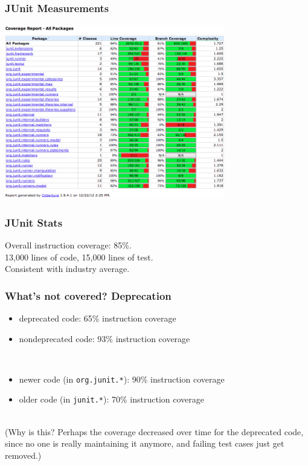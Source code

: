 \documentclass{beamer}
\newenvironment{changemargin}[1]{%
  \begin{list}{}{%
    \setlength{\topsep}{0pt}%
    \setlength{\leftmargin}{#1}%
    \setlength{\rightmargin}{1em}
    \setlength{\listparindent}{\parindent}%
    \setlength{\itemindent}{\parindent}%
    \setlength{\parsep}{\parskip}%
  }%
  \item[]}{\end{list}}
\begin{document}
\begin{frame}
  \frametitle{JUnit Measurements}
\begin{center}
  \includegraphics[height=3in]{L03/cobertura-junit.png}
\end{center}
\end{frame}

\begin{frame}
  \frametitle{JUnit Stats}
  \begin{changemargin}{2em}
    Overall instruction coverage: 85\%.\\[1em]
    13,000 lines of code, 15,000 lines of test.\\[1em]
    Consistent with industry average.
  \end{changemargin}
\end{frame}

\begin{frame}
  \frametitle{What's not covered? Deprecation}
  \begin{changemargin}{2em}
    \begin{itemize}
    \item deprecated code: 65\% instruction coverage
    \item nondeprecated code: 93\% instruction coverage
    \end{itemize}
    ~\\[1em]
    \begin{itemize}
    \item newer code (in {\tt org.junit.*}): 90\% instruction coverage
      \item older code (in {\tt junit.*}): 70\% instruction coverage
    \end{itemize}

    ~\\[1em]
  (Why is this? Perhaps the coverage decreased over time for the deprecated code, since
no one is really maintaining it anymore, and failing test cases just get removed.)
\end{changemargin}
\end{frame}
\end{document}
